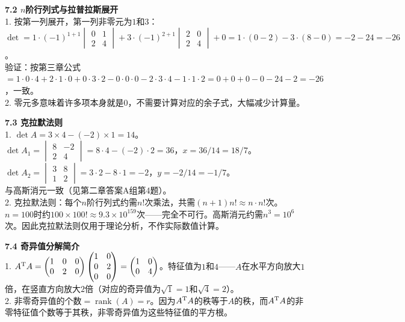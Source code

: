 \noindent\textbf{7.2 $n$阶行列式与拉普拉斯展开}\\
1. 按第一列展开，第一列非零元为$1$和$3$：\\
$\det = 1\cdot(-1)^{1+1}\begin{vmatrix}0&1\\2&4\end{vmatrix}+3\cdot(-1)^{2+1}\begin{vmatrix}2&0\\2&4\end{vmatrix}+0 = 1\cdot(0-2)-3\cdot(8-0) = -2-24 = -26$。\\
验证：按第三章公式$=1\cdot0\cdot4+2\cdot1\cdot0+0\cdot3\cdot2-0\cdot0\cdot0-2\cdot3\cdot4-1\cdot1\cdot2=0+0+0-0-24-2=-26$，一致。\\
2. 零元多意味着许多项本身就是$0$，不需要计算对应的余子式，大幅减少计算量。

\noindent\textbf{7.3 克拉默法则}\\
1. $\det A = 3\times4-(-2)\times1 = 14$。\\
$\det A_1 = \begin{vmatrix}8&-2\\2&4\end{vmatrix}=8\cdot4-(-2)\cdot2=36$，$x=36/14=18/7$。\\
$\det A_2 = \begin{vmatrix}3&8\\1&2\end{vmatrix}=3\cdot2-8\cdot1=-2$，$y=-2/14=-1/7$。\\
与高斯消元一致（见第二章答案A组第4题）。\\
2. 克拉默法则：每个$n$阶行列式约需$n!$次乘法，共需$(n+1)n!\approx n\cdot n!$次。$n=100$时约$100\times100!\approx9.3\times10^{159}$次——完全不可行。高斯消元约需$n^3=10^6$次。因此克拉默法则仅用于理论分析，不作实际数值计算。

\noindent\textbf{7.4 奇异值分解简介}\\
1. $A^{\text T}A = \begin{pmatrix}1&0&0\\0&2&0\end{pmatrix}\begin{pmatrix}1&0\\0&2\\0&0\end{pmatrix}=\begin{pmatrix}1&0\\0&4\end{pmatrix}$。特征值为$1$和$4$——$A$在水平方向放大$1$倍，在竖直方向放大$2$倍（对应的奇异值为$\sqrt{1}=1$和$\sqrt{4}=2$）。\\
2. 非零奇异值的个数$= \operatorname{rank}(A)=r$。因为$A^{\text T}A$的秩等于$A$的秩，而$A^{\text T}A$的非零特征值个数等于其秩，非零奇异值为这些特征值的平方根。

